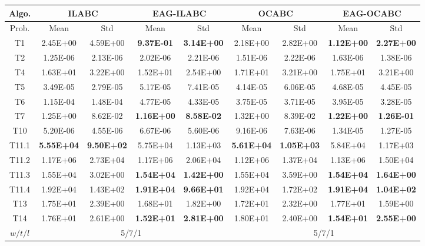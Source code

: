 \begin{table*}[!ht]
\begin{tabular}{|c|cc|cc|cc|cc|}
    \hline
    \hline
    Algo. & \multicolumn{2}{c|}{ILABC} & \multicolumn{2}{c|}{EAG-ILABC} & \multicolumn{2}{c|}{OCABC} & \multicolumn{2}{c|}{EAG-OCABC} \\
    \hline
    Prob. & Mean  & Std   & Mean  & Std   & Mean  & Std   & Mean  & Std \\
    \hline
    T1    & 2.45E+00 & 4.59E+00 & \textbf{9.37E-01} & \textbf{3.14E+00} & 2.18E+00 & 2.82E+00 & \textbf{1.12E+00} & \textbf{2.27E+00} \\
    T2    & 1.25E-06 & 2.13E-06 & 2.02E-06 & 2.21E-06 & 1.51E-06 & 2.22E-06 & 1.63E-06 & 1.38E-06 \\
    T4    & 1.63E+01 & 3.22E+00 & 1.52E+01 & 2.54E+00 & 1.71E+01 & 3.21E+00 & 1.75E+01 & 3.21E+00 \\
    T5    & 3.49E-05 & 2.79E-05 & 5.17E-05 & 7.41E-05 & 4.14E-05 & 6.06E-05 & 4.68E-05 & 4.45E-05 \\
    T6    & 1.15E-04 & 1.48E-04 & 4.77E-05 & 4.33E-05 & 3.75E-05 & 3.71E-05 & 3.95E-05 & 3.28E-05 \\
    T7    & 1.25E+00 & 8.62E-02 & \textbf{1.16E+00} & \textbf{8.58E-02} & 1.32E+00 & 8.39E-02 & \textbf{1.22E+00} & \textbf{1.26E-01} \\
    T10   & 5.20E-06 & 4.55E-06 & 6.67E-06 & 5.60E-06 & 9.16E-06 & 7.63E-06 & 1.34E-05 & 1.27E-05 \\
    T11.1 & \textbf{5.55E+04} & \textbf{9.50E+02} & 5.75E+04 & 1.13E+03 & \textbf{5.61E+04} & \textbf{1.05E+03} & 5.84E+04 & 1.17E+03 \\
    T11.2 & 1.17E+06 & 2.73E+04 & 1.17E+06 & 2.06E+04 & 1.12E+06 & 1.37E+04 & 1.13E+06 & 1.50E+04 \\
    T11.3 & 1.55E+04 & 3.02E+00 & \textbf{1.54E+04} & \textbf{1.42E+00} & 1.55E+04 & 3.59E+00 & \textbf{1.54E+04} & \textbf{1.64E+00} \\
    T11.4 & 1.92E+04 & 1.43E+02 & \textbf{1.91E+04} & \textbf{9.66E+01} & 1.92E+04 & 1.72E+02 & \textbf{1.91E+04} & \textbf{1.04E+02} \\
    T13   & 1.75E+01 & 2.39E+00 & 1.68E+01 & 1.82E+00 & 1.72E+01 & 2.32E+00 & 1.77E+01 & 1.59E+00 \\
    T14   & 1.76E+01 & 2.61E+00 & \textbf{1.52E+01} & \textbf{2.81E+00} & 1.80E+01 & 2.40E+00 & \textbf{1.54E+01} & \textbf{2.55E+00} \\
    \hline
    $w/t/l$ & \multicolumn{4}{c|}{5/7/1}     & \multicolumn{4}{c|}{5/7/1} \\
    \hline
    \end{tabular}%
  \label{tab:AG_CEC11}%
\end{table*}%
